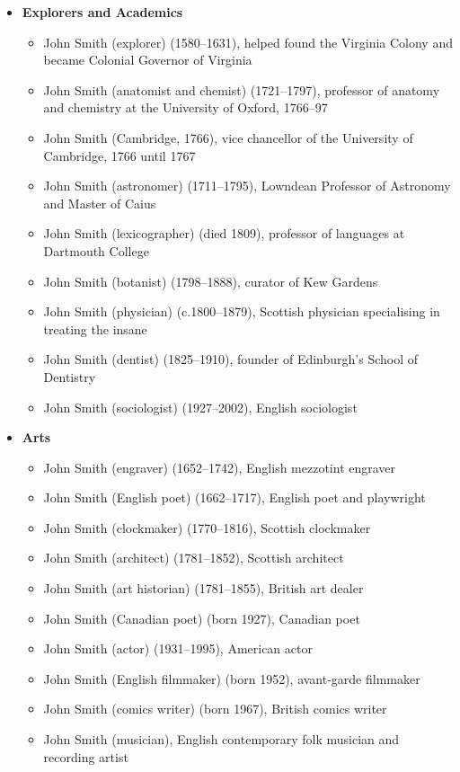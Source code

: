 \documentclass[landscape]{jhuslides3C}
\begin{document}
{\tiny
\begin{itemize}\itemsep 0mm
\item {\bf Explorers and Academics}
\begin{itemize}
\item John Smith (explorer) (1580--1631), helped found the Virginia Colony and became Colonial Governor of Virginia
\item John Smith (anatomist and chemist) (1721--1797), professor of anatomy and chemistry at the University of Oxford, 1766--97
\item John Smith (Cambridge, 1766), vice chancellor of the University of Cambridge, 1766 until 1767
\item John Smith (astronomer) (1711--1795), Lowndean Professor of Astronomy and Master of Caius
\item John Smith (lexicographer) (died 1809), professor of languages at Dartmouth College
\item John Smith (botanist) (1798--1888), curator of Kew Gardens
\item John Smith (physician) (c.1800--1879), Scottish physician specialising in treating the insane
\item John Smith (dentist) (1825--1910), founder of Edinburgh's School of Dentistry
\item John Smith (sociologist) (1927--2002), English sociologist
\end{itemize}
\item {\bf Arts}
\begin{itemize}
\item John Smith (engraver) (1652--1742), English mezzotint engraver
\item John Smith (English poet) (1662--1717), English poet and playwright
\item John Smith (clockmaker) (1770--1816), Scottish clockmaker
\item John Smith (architect) (1781--1852), Scottish architect
\item John Smith (art historian) (1781--1855), British art dealer
\item John Smith (Canadian poet) (born 1927), Canadian poet
\item John Smith (actor) (1931--1995), American actor
\item John Smith (English filmmaker) (born 1952), avant-garde filmmaker
\item John Smith (comics writer) (born 1967), British comics writer
\item John Smith (musician), English contemporary folk musician and recording artist

\end{itemize}
\end{itemize}}
\end{document}
